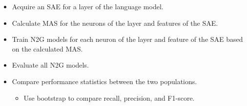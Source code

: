 \begin{itemize}
    \item Acquire an SAE for a layer of the language model.
    \item Calculate MAS for the neurons of the layer and features of the SAE.
    \item Train N2G models for each neuron of the layer and feature of the SAE based on the calculated MAS.
    \item Evaluate all N2G models.
    \item Compare performance statistics between the two populations.
    \begin{itemize}
        \item Use bootstrap to compare recall, precision, and F1-score.
    \end{itemize}
\end{itemize}

